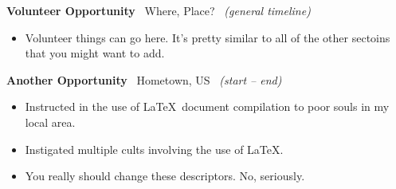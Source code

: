 \documentclass[class=article, crop=false]{standalone}
\begin{document}
\textbf{Volunteer Opportunity} \textbar\ Where, Place? \hfill\ 
\textsl{(general timeline)}

\begin{itemize}[leftmargin=*]
    \item Volunteer things can go here. It's pretty similar to all of the other 
          sectoins that you might want to add.
\end{itemize}

\split

\textbf{Another Opportunity} \textbar\ Hometown, US \hfill\ 
\textsl{(start -- end)}

\begin{itemize}[leftmargin=*]
    \item Instructed in the use of \LaTeX\ document compilation to poor souls
          in my local area.
          
    \item Instigated multiple cults involving the use of \LaTeX.

    \item You really should change these descriptors. No, seriously.
\end{itemize}

\end{document}

